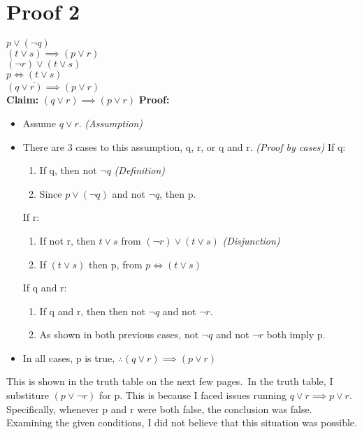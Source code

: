 \documentclass[11pt]{article}
\begin{document}
\section*{Proof 2}
\label{sec:org45cf2ac}

$p\lor(\lnot q)$\\
$(t\lor s)\implies(p\lor r)$ \\
$(\lnot r)\lor(t\lor s)$ \\
$\underline{p\iff(t\lor s)}$\\
$(q\lor r)\implies(p\lor r)$\\
\newline\newline
\textbf{Claim:} $(q\lor r)\implies(p\lor r)$\newline
\textbf{Proof:}
\begin{itemize}
\item Assume $q\lor r$.  \textit{(Assumption)}
\item There are 3 cases to this assumption, q, r, or q and r. \textit{(Proof by cases)}\newline
If q:
\begin{enumerate}
\item If q, then not $\lnot q$ \textit{(Definition)}
\item Since $p\lor(\lnot q)$ and not $\lnot q$, then p.
\end{enumerate}\newline
If r:
\begin{enumerate}
\item If not r, then $t\lor s$ from $(\lnot r)\lor(t\lor s)$ \textit{(Disjunction)}
\item If $(t\lor s)$ then p, from $p \iff (t\lor s)$
\end{enumerate}
If q and r:
\begin{enumerate}
\item If q and r, then then not $\lnot q$ and not $\lnot r$.
\item As shown in both previous cases, not $\lnot q$ and not $\lnot r$ both imply p.
\end{enumerate}
\item In all cases, p is true, $\therefore(q\lor r)\implies(p\lor r)$
\end{itemize}
This is shown in the truth table on the next few pages.\
In the truth table, I substiture $(p \lor \lnot r)$ for p.
This is because I faced issues running $q\lor r \implies p\lor r$.
Specifically, whenever p and r were both false, the conclusion was false.
Examining the given conditions, I did not believe that this situation was possible.
\end{document}
